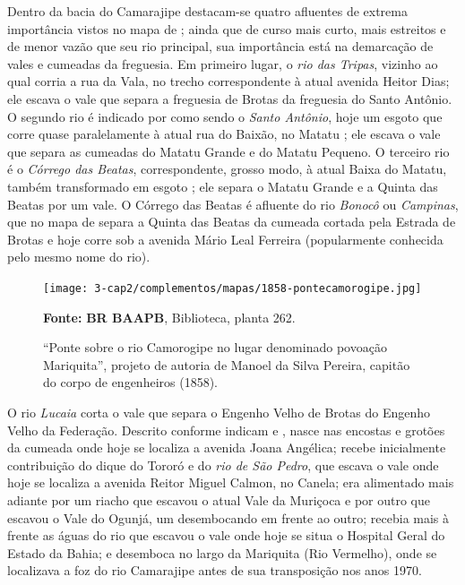 Dentro da bacia do Camarajipe destacam-se quatro afluentes de extrema importância vistos no mapa de ; ainda que de curso mais curto, mais estreitos e de menor vazão que seu rio principal, sua importância está na demarcação de vales e cumeadas da freguesia. Em primeiro lugar, o \textit{rio das Tripas}, vizinho ao qual corria a rua da Vala, no trecho correspondente à atual avenida Heitor Dias; ele escava o vale que separa a freguesia de Brotas da freguesia do Santo Antônio. O segundo rio é indicado por  como sendo o \textit{Santo Antônio}, hoje um esgoto que corre quase paralelamente à atual rua do Baixão, no Matatu \cite[p.~136]{santos_aguas_2010}; ele escava o vale que separa as cumeadas do Matatu Grande e do Matatu Pequeno. O terceiro rio é o \textit{Córrego das Beatas}, correspondente, grosso modo, à atual Baixa do Matatu, também transformado em esgoto \cite[p.~158]{santos_aguas_2010}; ele separa o Matatu Grande e a Quinta das Beatas por um vale. O Córrego das Beatas é afluente do rio \textit{Bonocô} ou \textit{Campinas}, que no mapa de  separa a Quinta das Beatas da cumeada cortada pela Estrada de Brotas e hoje corre sob a avenida Mário Leal Ferreira (popularmente conhecida pelo mesmo nome do rio).

\begin{figure}
\caption{``Ponte sobre o rio Camorogipe no lugar denominado povoação Mariquita'', projeto de autoria de Manoel da Silva Pereira, capitão do corpo de engenheiros (1858).}
\centering
\texttt{[image: 3-cap2/complementos/mapas/1858-pontecamorogipe.jpg]}{\footnotesize \par \textbf{Fonte:} \textbf{BR BAAPB}, Biblioteca, planta 262. \par}
\label{fig:pontecamorogipe}
\end{figure}

O rio \textit{Lucaia} corta o vale que separa o Engenho Velho de Brotas do Engenho Velho da Federação. Descrito conforme indicam  e , nasce nas encostas e grotões da cumeada onde hoje se localiza a avenida Joana Angélica; recebe inicialmente contribuição do dique do Tororó e do \textit{rio de São Pedro}, que escava o vale onde hoje se localiza a avenida Reitor Miguel Calmon, no Canela; era alimentado mais adiante por um riacho que escavou o atual Vale da Muriçoca e por outro que escavou o Vale do Ogunjá, um desembocando em frente ao outro; recebia mais à frente as águas do rio que escavou o vale onde hoje se situa o Hospital Geral do Estado da Bahia; e desemboca no largo da Mariquita (Rio Vermelho), onde se localizava a foz do rio Camarajipe antes de sua transposição nos anos 1970.

